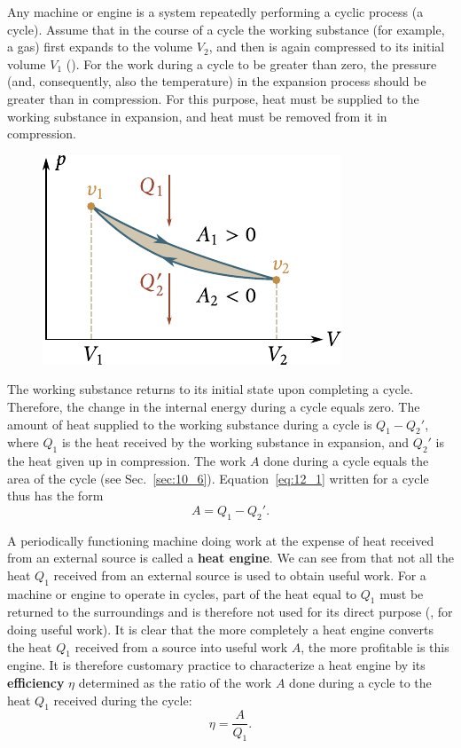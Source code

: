 Any machine or engine is a system repeatedly performing a cyclic process (a cycle). Assume that in the course of a cycle the working substance (for example, a gas) first expands to the volume $V_2$, and then is again compressed to its initial volume $V_1$ (). For the work during a cycle to be greater than zero, the pressure (and, consequently, also the temperature) in the expansion process should be greater than in compression. For this purpose, heat must be supplied to the working substance in expansion, and heat must be removed from it in compression.

\begin{figure}[t]
	\begin{center}
		\includegraphics[scale=1.0]{figures/ch_12/fig_12_1.pdf}
		\caption[]{}
		\label{fig:12_1}
	\end{center}
	\vspace{-0.8cm}
\end{figure}

The working substance returns to its initial state upon completing a cycle. Therefore, the change in the internal energy during a cycle equals zero. The amount of heat supplied to the working substance during a cycle is $Q_1-Q_2'$, where $Q_1$ is the heat received by the working substance in expansion, and $Q_2'$ is the heat given up in compression. The work $A$ done during a cycle equals the area of the cycle (see Sec.~\ref{sec:10_6}). Equation~\eqref{eq:12_1} written for a cycle thus has the form
\begin{equation}\label{eq:12_3}
	A = Q_1 - Q_2'.
\end{equation}

A periodically functioning machine doing work at the expense of heat received from an external source is called a \textbf{heat engine}. We can see from  that not all the heat $Q_1$ received from an external source is used to obtain useful work. For a machine or engine to operate in cycles, part of the heat equal to $Q_1$ must be returned to the surroundings and is therefore not used for its direct purpose (\ie, for doing useful work). It is clear that the more completely a heat engine converts the heat $Q_1$ received from a source into useful work $A$, the more profitable is this engine. It is therefore customary practice to characterize a heat engine by its \textbf{efficiency} $\eta$ determined as the ratio of the work $A$ done during a cycle to the heat $Q_1$ received during the cycle:
\begin{equation}\label{eq:12_4}
	\eta = \frac{A}{Q_1}.
\end{equation}

